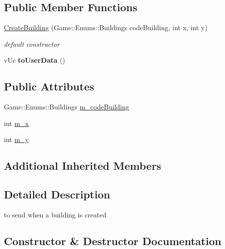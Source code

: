 \subsection*{Public Member Functions}
\begin{DoxyCompactItemize}
\item 
\hyperlink{class_network_1_1_messages_1_1_create_building_aef565c7a818877369202017e182ffc31}{Create\+Building} (Game\+::\+Enums\+::\+Buildings code\+Building, int x, int y)
\begin{DoxyCompactList}\small\item\em default constructor \end{DoxyCompactList}\item 
\mbox{\label{class_network_1_1_messages_1_1_create_building_aff5b43b995c3e24c6bedc0c2d902ed55}} 
v\+Uc {\bfseries to\+User\+Data} ()
\end{DoxyCompactItemize}
\subsection*{Public Attributes}
\begin{DoxyCompactItemize}
\item 
Game\+::\+Enums\+::\+Buildings \hyperlink{class_network_1_1_messages_1_1_create_building_acee7d9dd3792fc063710fe500b58b7ac}{m\+\_\+code\+Building}
\item 
int \hyperlink{class_network_1_1_messages_1_1_create_building_a283bed1215dd94990514cad9d537dfc9}{m\+\_\+x}
\item 
int \hyperlink{class_network_1_1_messages_1_1_create_building_aa051acad8da56c9c40cc627e3464a5fc}{m\+\_\+y}
\end{DoxyCompactItemize}
\subsection*{Additional Inherited Members}


\subsection{Detailed Description}
to send when a building is created 

\subsection{Constructor \& Destructor Documentation}
\mbox{\label{class_network_1_1_messages_1_1_create_building_aef565c7a818877369202017e182ffc31}} 
